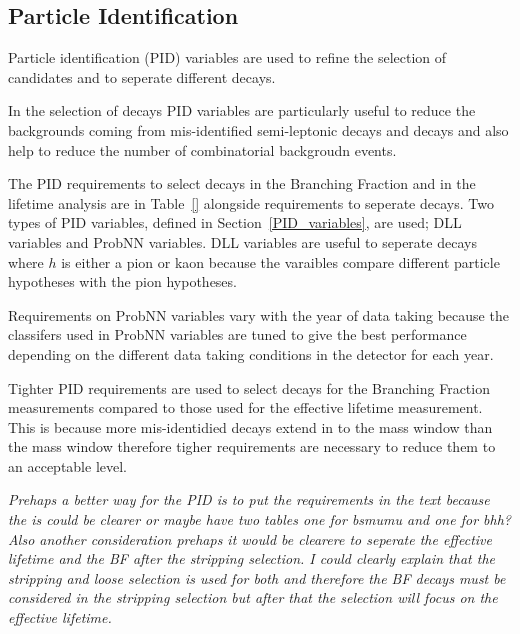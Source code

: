 


\subsection{Particle Identification}
\label{sec:PID}
Particle identification (PID) variables are used to refine the selection of \bmumu candidates and to seperate different \bhh decays. 

In the selection of \bmumu decays PID variables are particularly useful to reduce the backgrounds coming from mis-identified semi-leptonic decays and \bhh decays and also help to reduce the number of combinatorial backgroudn events. 

The PID requirements to select \bmumu decays in the Branching Fraction and \bsmumu in the lifetime analysis are in Table~\ref{} alongside requirements to seperate \bhh decays. Two types of PID variables, defined in Section~\ref{PID_variables}, are used; DLL variables and ProbNN variables. DLL variables are useful to seperate \bhh decays where $h$ is either a pion or kaon because the varaibles compare different particle hypotheses with the pion hypotheses.

Requirements on ProbNN variables vary with the year of data taking because the classifers used in ProbNN variables are tuned to give the best performance depending on the different data taking conditions in the detector for each year. %

Tighter PID requirements are used to select \bmumu decays for the Branching Fraction measurements compared to those used for the effective lifetime measurement. This is because more mis-identidied decays extend in to the \bd mass window than the \bs mass window therefore tigher requirements are necessary to reduce them to an acceptable level. %

{\it Prehaps a better way for the PID is to put the requirements in the text because the is could be clearer or maybe have two tables one for bsmumu and one for bhh? Also another consideration prehaps it would be clearere to seperate the effective lifetime and the BF after the stripping selection. I could clearly explain that the stripping and loose selection is used for both and therefore the BF decays must be considered in the stripping selection but after that the selection will focus on the effective lifetime. }



